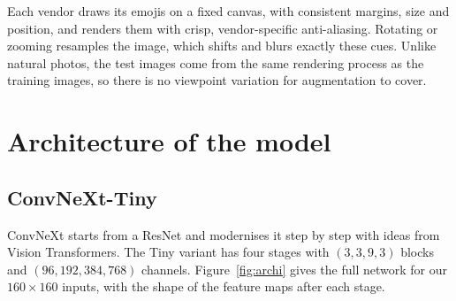 \documentclass[11pt,a4paper]{article}
\begin{document}
\begin{keybox}[title={Why augmentation hurts here}]
Each vendor draws its emojis on a fixed canvas, with consistent margins, size and position, and
renders them with crisp, vendor-specific anti-aliasing. Rotating or zooming resamples the image, which
shifts and blurs exactly these cues. Unlike natural photos, the test images come from the same rendering
process as the training images, so there is no viewpoint variation for augmentation to cover.
\end{keybox}

\section{Architecture of the model}
\label{sec:archi}

\subsection{ConvNeXt-Tiny}

ConvNeXt \cite{liu2022convnext} starts from a ResNet and modernises it step by step with ideas from
Vision Transformers. The Tiny variant has four stages with $(3,3,9,3)$ blocks and $(96,192,384,768)$
channels. Figure~\ref{fig:archi} gives the full network for our $160\times160$ inputs, with the shape of
the feature maps after each stage.
\end{document}

